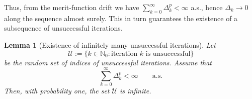 \documentclass[11pt,a4paper]{article}
\newtheorem{lemma}{Lemma}[section]
\newcommand{\tdelta}{\Delta}
\newcommand{\Dexp}{p}
\begin{document}
Thus, from the merit-function drift we have
\(\sum_{k=0}^\infty \Delta_k^{\Dexp}<\infty\) a.s., hence \(\Delta_k\to0\) along the sequence almost surely. This in turn guarantees the existence of a subsequence of unsuccessful iterations.
\begin{lemma}[Existence of infinitely many unsuccessful iterations] \label{lem:inf-unsuccessful}
Let
\[
    \mathcal U
    :=
    \{k\in\mathbb N_0 : \text{iteration } k \text{ is unsuccessful}\}
\]
be the random set of indices of unsuccessful iterations. Assume that
\[
    \sum_{k=0}^{\infty}\Delta_k^{\Dexp}<\infty
    \qquad \text{a.s.}
\]
Then, with probability one, the set $\mathcal U$ is infinite.
\end{lemma}
\end{document}
